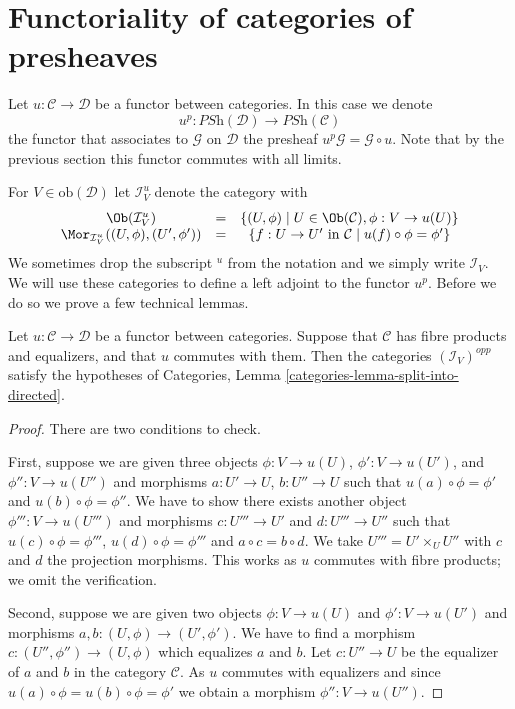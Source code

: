 \section{Functoriality of categories of presheaves}
\label{section-functoriality-PSh}

\noindent
Let $u : \mathcal{C} \to \mathcal{D}$ be a functor between categories.
In this case we denote
$$
u^p :
\textit{PSh}(\mathcal{D})
\longrightarrow
\textit{PSh}(\mathcal{C})
$$
the functor that associates to $\mathcal{G}$ on $\mathcal{D}$ the presheaf
$u^p\mathcal{G} = \mathcal{G} \circ u$. Note that by the previous section
this functor commutes with all limits.

\medskip\noindent
For $V \in \text{ob}(\mathcal{D})$ let $\mathcal{I}^u_V$
denote the category with
\begin{equation}
\label{equation-colim-category}
\begin{matrix}
\Ob(\mathcal{I}^u_V)
&
=
&
\{
(U, \phi)
\mid
U \in \Ob(\mathcal{C}),
\phi : V \to u(U)
\}
\\
\Mor_{\mathcal{I}^u_V}((U, \phi), (U', \phi'))
&
=
&
\{
f : U \to U' \text{ in }\mathcal{C}
\mid
u(f) \circ \phi = \phi'
\}
\end{matrix}
\end{equation}
We sometimes drop the subscript ${}^u$ from the notation and we simply write
$\mathcal{I}_V$.
We will use these categories to define a left adjoint to the functor $u^p$.
Before we do so we prove a few technical lemmas.

\begin{lemma}
\label{lemma-almost-directed}
Let $u : \mathcal{C} \to \mathcal{D}$ be a functor between categories.
Suppose that $\mathcal{C}$ has fibre products and equalizers, and that
$u$ commutes with them. Then the categories $(\mathcal{I}_V)^{opp}$
satisfy the hypotheses of
Categories, Lemma \ref{categories-lemma-split-into-directed}.
\end{lemma}

\begin{proof}
There are two conditions to check.

\medskip\noindent
First, suppose we are given three objects
$\phi : V \to u(U)$, $\phi' : V \to u(U')$, and $\phi'' : V \to u(U'')$
and morphisms $a : U' \to U$, $b : U'' \to U$ such that
$u(a) \circ \phi = \phi'$ and $u(b) \circ \phi = \phi''$.
We have to show there exists another object $\phi''' : V \to u(U''')$
and morphisms $c : U''' \to U'$ and $d : U''' \to U''$ such that
$u(c) \circ \phi = \phi'''$, $u(d) \circ \phi = \phi'''$ and
$a \circ c = b \circ d$. We take $U''' = U' \times_U U''$
with $c$ and $d$ the projection morphisms. This works as $u$ commutes
with fibre products; we omit the verification.

\medskip\noindent
Second, suppose we are given two objects
$\phi : V \to u(U)$ and $\phi' : V \to u(U')$
and morphisms $a, b : (U, \phi) \to (U', \phi')$.
We have to find a morphism $c : (U'', \phi'') \to (U, \phi)$
which equalizes $a$ and $b$. Let $c : U'' \to U$ be the equalizer of
$a$ and $b$ in the category $\mathcal{C}$. As $u$ commutes
with equalizers and since $u(a) \circ \phi = u(b) \circ \phi = \phi'$
we obtain a morphism $\phi'' : V \to u(U'')$.
\end{proof}

